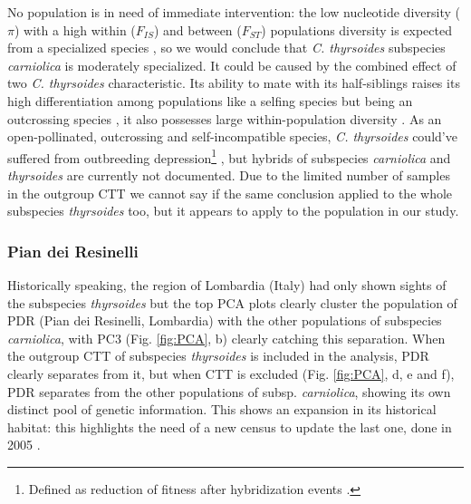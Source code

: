 \documentclass[a4paper, 12pt]{report}
\begin{document}
No population is in need of immediate intervention: the low nucleotide diversity ($\pi$) with a high within ($F_{IS}$) and between ($F_{ST}$) populations diversity is expected from a specialized species \parencite{habelBurdenGeneticDiversity2012}, so we would conclude that \textit{C. thyrsoides} subspecies \textit{carniolica} is moderately specialized. It could be caused by the combined effect of two \textit{C. thyrsoides} characteristic. Its ability to mate with its half-siblings \parencite{aegisdottirNoInbreedingDepression2007} raises its high differentiation among populations like a selfing species but being an outcrossing species \parencite{aegisdottirIsolatedPopulationsRare2009}, it also possesses large within-population diversity \parencite{aguilarGeneticConsequencesHabitat2008}. As an open-pollinated, outcrossing and self-incompatible species, \textit{C. thyrsoides} could've suffered from outbreeding depression\footnote{Defined as reduction of fitness after hybridization events \parencite{volisQuasiSituBridge2010}.} \parencite{volisQuasiSituBridge2010}, but hybrids of subspecies \textit{carniolica} and \textit{thyrsoides} are currently not documented. Due to the limited number of samples in the outgroup CTT we cannot say if the same conclusion applied to the whole subspecies \textit{thyrsoides} too, but it appears to apply to the population in our study.

\subsubsection{Pian dei Resinelli}
Historically speaking, the region of Lombardia (Italy) had only shown sights of the subspecies \textit{thyrsoides} but the top PCA plots clearly cluster the population of PDR (Pian dei Resinelli, Lombardia) with the other populations of subspecies \textit{carniolica}, with PC3 (Fig. \ref{fig:PCA}, b) clearly catching this separation. When the outgroup CTT of subspecies \textit{thyrsoides} is included in the analysis, PDR clearly separates from it, but when CTT is excluded (Fig. \ref{fig:PCA}, d, e and f), PDR separates from the other populations of subsp. \textit{carniolica}, showing its own distinct pool of genetic information. This shows an expansion in its historical habitat: this highlights the need of a new census to update the last one, done in 2005 \parencite{fabiocontiAnnotatedChecklistItalian2005}.  
\end{document}
